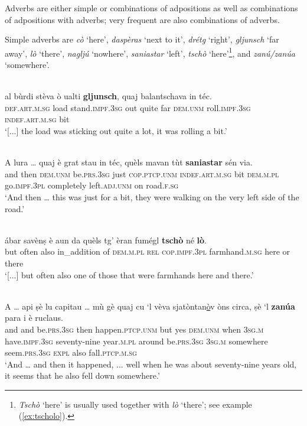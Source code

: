 Adverbs are either simple or combinations of adpositions as well as combinations of adpositions with adverbs; very frequent are also combinations of adverbs.

Simple adverbs are \textit{cò} `here', \textit{daspèras} `next to it', \textit{drétg} `right', \textit{gljunsch} `far away', \textit{lò} `there', \textit{nagljú} `nowhere',  \textit{saniastar} `left', \textit{tschò} `here'\footnote{\textit{Tschò} `here' is usually used together with \textit{lò} `there'; see example (\ref{ex:tscholo}).}, and \textit{zanú/zanúa} `somewhere'.

\ea
\label{}
\\
\gll  [...] al bùrdi stèva ò ualti \textbf{gljunsch}, quaj balantschava in téc.\\
{} \textsc{def.art.m.sg} load  stand.\textsc{impf.3sg} out quite far \textsc{dem.unm} roll.\textsc{impf.3sg}  \textsc{indef.art.m.sg} bit\\
\glt `[...] the load was sticking out quite a lot, it was rolling a bit.'
\z

\ea
\label{}
\\
\gll A lura … quaj è grat stau in téc, quèls mavan tùt \textbf{saniastar} sén via. \\
and then {} \textsc{dem.unm} be.\textsc{prs.3sg} just \textsc{cop.ptcp.unm} \textsc{indef.art.m.sg} bit \textsc{dem.m.pl} go.\textsc{impf.3pl} completely left.\textsc{adj.unm} on road.\textsc{f.sg}  \\
\glt `And then … this was just for a bit, they were walking on the very left side of the road.'
\z

\ea
\label{ex:tscholo}
\\
\gll [...] ábar savènṣ è aun da quèls tg’ èran fumégl \textbf{tschò} né \textbf{lò}.\\
{} but often also in\_addition of \textsc{dem.m.pl} \textsc{rel} \textsc{cop.impf.3pl} farmhand.\textsc{m.sg} here or there\\
\glt `[...] but often also one of those that were farmhands here and there.'
\z

\ea
\label{}
\\
\gll  A … api ṣè lu capitau … mù gè quaj cu `l vèva sjatòntan\underline{ò}v òns circa, ṣè `l \textbf{zanúa} para i è ruclaus.  \\
and {} and be.\textsc{prs.3sg} then happen.\textsc{ptcp.unm} {} but yes \textsc{dem.unm} when \textsc{3sg.m} have.\textsc{impf.3sg} seventy-nine year.\textsc{m.pl} around be.\textsc{prs.3sg} \textsc{3sg.m} somewhere  seem.\textsc{prs.3sg} \textsc{expl} also fall.\textsc{ptcp.m.sg}\\
\glt `And … and then it happened, ... well when he was about seventy-nine years old, it seems that he also fell down somewhere.'
\z

